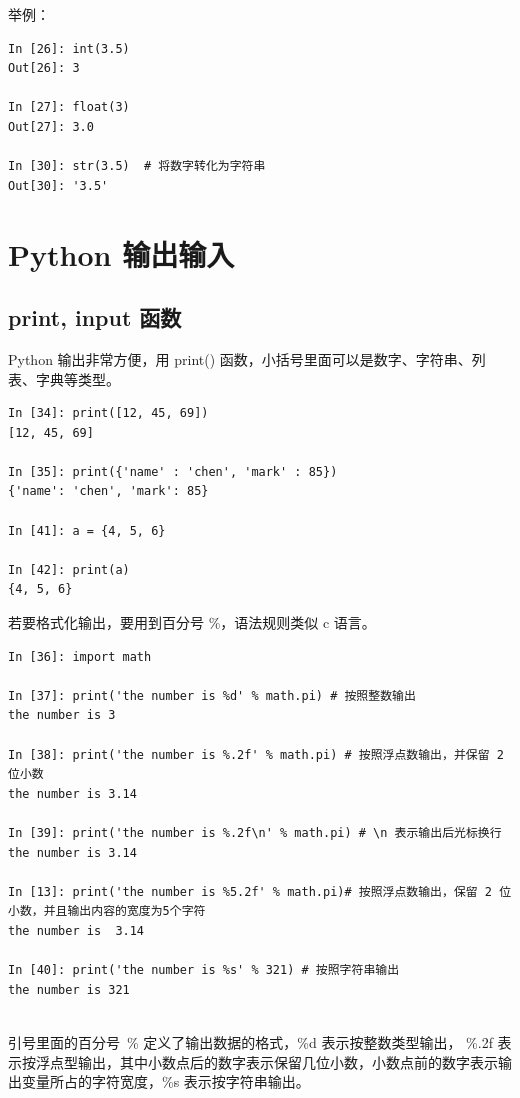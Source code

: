 举例：

\begin{lstlisting}[Language=Python]
In [26]: int(3.5)
Out[26]: 3

In [27]: float(3)
Out[27]: 3.0

In [30]: str(3.5)  # 将数字转化为字符串
Out[30]: '3.5'
\end{lstlisting}

\section{Python 输出输入}
\subsection{print, input 函数}

Python 输出非常方便，用 print() 函数，小括号里面可以是数字、字符串、列表、字典等类型。

\begin{lstlisting}[Language=Python]
In [34]: print([12, 45, 69])
[12, 45, 69]

In [35]: print({'name' : 'chen', 'mark' : 85})
{'name': 'chen', 'mark': 85}

In [41]: a = {4, 5, 6}

In [42]: print(a)
{4, 5, 6}
\end{lstlisting}

若要格式化输出，要用到百分号 \%，语法规则类似 c 语言。

\begin{lstlisting}[Language=Python]
In [36]: import math

In [37]: print('the number is %d' % math.pi) # 按照整数输出
the number is 3

In [38]: print('the number is %.2f' % math.pi) # 按照浮点数输出，并保留 2 位小数
the number is 3.14

In [39]: print('the number is %.2f\n' % math.pi) # \n 表示输出后光标换行
the number is 3.14

In [13]: print('the number is %5.2f' % math.pi)# 按照浮点数输出，保留 2 位小数，并且输出内容的宽度为5个字符
the number is  3.14

In [40]: print('the number is %s' % 321) # 按照字符串输出
the number is 321


\end{lstlisting}

引号里面的百分号~\% 定义了输出数据的格式，\%d 表示按整数类型输出， \%.2f 表示按浮点型输出，其中小数点后的数字表示保留几位小数，小数点前的数字表示输出变量所占的字符宽度，\%s 表示按字符串输出。

